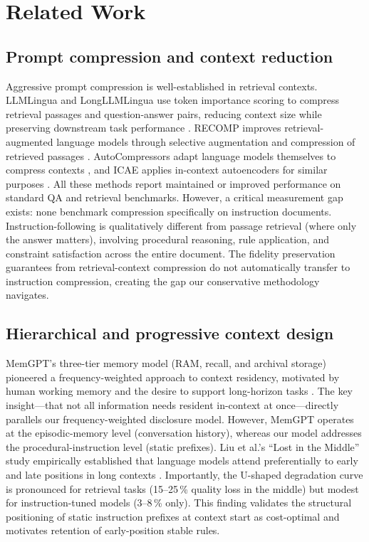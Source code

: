 \section{Related Work}
\label{sec:related}

\subsection{Prompt compression and context reduction}

Aggressive prompt compression is well-established in retrieval contexts.
LLMLingua and LongLLMLingua use token importance scoring to compress
retrieval passages and question-answer pairs, reducing context size while
preserving downstream task performance \cite{llmlingua,longllmlingua}.
RECOMP improves retrieval-augmented language models through selective
augmentation and compression of retrieved passages \cite{recomp}.
AutoCompressors adapt language models themselves to compress contexts
\cite{autocompressors}, and ICAE applies in-context autoencoders for
similar purposes \cite{icae}. All these methods report maintained or improved
performance on standard QA and retrieval benchmarks. However, a critical
measurement gap exists: none benchmark compression specifically on instruction
documents. Instruction-following is qualitatively different from passage
retrieval (where only the answer matters), involving procedural reasoning,
rule application, and constraint satisfaction across the entire document.
The fidelity preservation guarantees from retrieval-context compression do not
automatically transfer to instruction compression, creating the gap our
conservative methodology navigates.

\subsection{Hierarchical and progressive context design}

MemGPT's three-tier memory model (RAM, recall, and archival storage) pioneered
a frequency-weighted approach to context residency, motivated by human working
memory and the desire to support long-horizon tasks \cite{memgpt}. The key
insight—that not all information needs resident in-context at once—directly
parallels our frequency-weighted disclosure model. However, MemGPT operates at
the episodic-memory level (conversation history), whereas our model addresses
the procedural-instruction level (static prefixes). Liu et al.'s ``Lost in the
Middle'' study empirically established that language models attend
preferentially to early and late positions in long contexts \cite{lostinmiddle}.
Importantly, the U-shaped degradation curve is pronounced for retrieval tasks
(15--25\,\% quality loss in the middle) but modest for instruction-tuned models
(3--8\,\% only). This finding validates the structural positioning of static
instruction prefixes at context start as cost-optimal and motivates retention of
early-position stable rules.

